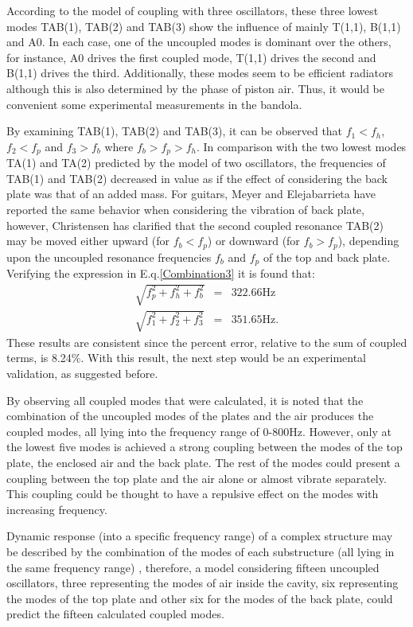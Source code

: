According to the model of coupling with three oscillators, these three lowest modes TAB(1), TAB(2) and TAB(3) show the influence of mainly T(1,1), B(1,1) and A0. In each case, one of the uncoupled modes is dominant over the others, for instance, A0 drives the first coupled mode, T(1,1) drives the second and B(1,1) drives the third. Additionally, these modes seem to be efficient radiators although this is also determined by the phase of piston air. Thus, it would be convenient some experimental measurements in the bandola.

By examining TAB(1), TAB(2) and TAB(3), it can be observed that $f_1<f_h$, $f_2<f_p$ and $f_3>f_b$ where $f_b>f_p>f_h$. In comparison with the two lowest modes TA(1) and TA(2) predicted by the model of two oscillators, the frequencies of TAB(1) and TAB(2) decreased in value as if the effect of considering the back plate was that of an added mass. For guitars, Meyer and Elejabarrieta \cite{Elejabarrieta, Elejabarrieta1} have reported the same behavior when considering the vibration of back plate, however, Christensen \cite{Christensen3} has clarified that the second coupled resonance TAB(2) may be moved either upward (for $f_b<f_p$) or downward (for $f_b>f_p$), depending upon the uncoupled resonance frequencies $f_b$ and $f_p$ of the top and back plate.\\Verifying the expression in E.q.\ref{Combination3} it is found that:
\begin{eqnarray*}
\sqrt{f_p^2 + f_h^2 + f_b^2} & = & 322.66 \text{Hz}\\
\sqrt{f_1^2 + f_2^2 + f_3^2} & = & 351.65 \text{Hz}.
\end{eqnarray*}
These results are consistent since the percent error, relative to the sum of coupled terms, is 8.24\%. With this result, the next step would be an experimental validation, as suggested before.

By observing all coupled modes that were calculated, it is noted that the combination of the uncoupled modes of the plates and the air produces the coupled modes, all lying into the frequency range of 0-800Hz. However, only at the lowest five modes is achieved a strong coupling between the modes of the top plate, the enclosed air and the back plate. The rest of the modes could present a coupling between the top plate and the air alone or almost vibrate separately. This coupling could be thought to have a repulsive effect on the modes with increasing frequency.   

Dynamic response (into a specific frequency range) of a complex structure may be described by the combination of the modes of each substructure (all lying in the same frequency range) \cite{Ewins}, therefore, a model considering fifteen uncoupled oscillators, three representing the modes of air inside the cavity, six representing the modes of the top plate and other six for the modes of the back plate, could predict the fifteen calculated coupled modes. 
